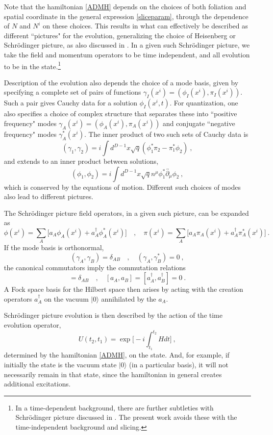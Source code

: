 \documentclass[12pt]{article}
\numberwithin{equation}{section}
\newcommand{\beq}{\begin{equation}}
\newcommand{\eeq}{\end{equation}}
\begin{document}
Note that the hamiltonian \eqref{ADMH} depends on the choices of both foliation and spatial coordinate in the general expression
\eqref{sliceparam}, through the dependence of $N$ and $N^i$ on these choices.  This results in what can effectively be described as different ``pictures" for the evolution, generalizing the choice of Heisenberg or Schr\"odinger picture, as also discussed in \cite{SE2d}.  In a given such Schr\"odinger picture, we take the field and momentum operators to be time independent, and all evolution to be in the state.\footnote{In a time-dependent background, there are further subtleties with Schr\"odinger picture discussed in \cite{ToVa,CMOV,CFMM,AgAs,MuOe}. The present work avoids these with the time-independent background and slicing.}  

Description of the evolution also depends the choice of a mode basis, given by specifying a complete set of pairs of functions $\gamma_I(x^i)=(\phi_I(x^i),\pi_I(x^i))$.  Such a pair gives Cauchy data for a solution $\phi_I(x^i,t)$.  For quantization, one also specifies  a choice of complex structure 
\cite{More,Kay,AgAs} that separates these into ``positive frequency" modes $\gamma_A(x^i)=(\phi_A(x^i),\pi_A(x^i))$ and conjugate ``negative frequency" modes $\gamma_A^*(x^i)$.  
The inner product of two such sets of Cauchy data is 
\beq
(\gamma_1, \gamma_2)= i\int d^{D-1}x \sqrt{q}(\phi_1^*\pi_2-\pi_1^*\phi_2)\ ,
\eeq
and extends to an inner product between solutions,  
\beq\label{InnerProduct}
(\phi_1,\phi_2) = i \int d^{D-1} x \sqrt{q} n^\mu \phi_1^*\overleftrightarrow{\partial_\mu} \phi_2\ ,
\eeq
which is conserved by the equations of motion.  Different such choices of modes also lead to different pictures.

The Schr\"odinger picture field operators, in a given such picture, can be expanded as
\beq\label{opexps}
\phi(x^i) = \sum_A \big[a_A \phi_A(x^i)+a_A^{\dagger} \phi_A^*(x^i)\big]\quad ,\quad \pi(x^i) = \sum_A \big[a_A\pi_A(x^i)+a_A^{\dagger} \pi_A^*(x^i)\big]\ .
\eeq
If the mode basis is orthonormal,
\beq
(\gamma_A,\gamma_B) = \delta_{AB}\quad , \quad (\gamma_A,\gamma_B^*) = 0\ ,
\eeq 
the canonical commutators imply the commutation relations
\beq
[a_A, a_B^{\dagger}] = \delta_{AB}\quad ,\quad  [a_A, a_B]=[a_A^{\dagger}, a_B^{\dagger}] = 0\ .
\eeq
A Fock space basis for the Hilbert space then arises by acting with the creation operators $a_A^\dagger$ on the vacuum $|0\rangle$ annihilated by the $a_A$.  

Schr\"odinger picture evolution is then described by the action of the time evolution operator,
\beq
U(t_2, t_1)= \exp{\bigg[-i\int_{t_1}^{t_2} H dt\bigg]}\ ,
\eeq
determined by the hamiltonian \eqref{ADMH}, on the state.  And, for example, if initially the state is the vacuum state $|0\rangle$ (in a particular basis), it will not necessarily remain in that state, since the hamiltonian in general creates additional excitations.
\end{document}
